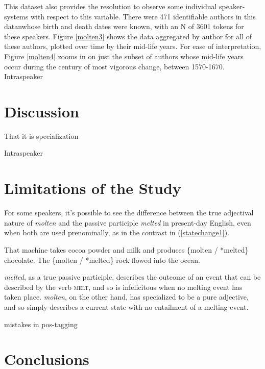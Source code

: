 \documentclass{artikel3}
\begin{document}
This dataset also provides the resolution to observe some individual speaker-systems with respect to this variable. There were 471 identifiable authors in this datanwhose birth and death dates were known, with an N of 3601 tokens for these speakers. Figure \ref{molten3} shows the data aggregated by author for all of these authors, plotted over time by their mid-life years. For ease of interpretation, Figure \ref{molten4} zooms in on just the subset of authors whose mid-life years occur during the century of most vigorous change, between 1570-1670. Intraspeaker



\section{Discussion}
\label{discuss}

That it is specialization

Intraspeaker

\section{Limitations of the Study}
\label{limitations}


For some speakers, it's possible to see the difference between the true adjectival nature of \textsl{molten} and the passive participle \textsl{melted} in present-day English, even when both are used prenominally, as in the contrast in (\ref{statechange1}). 

\begin{exe}
	\ex \label{statechange1} That machine takes cocoa powder and milk and produces \{molten / *melted\} chocolate.
	\ex \label{statechange2} The \{molten / *melted\} rock flowed into the ocean.
\end{exe}

\noindent \textsl{melted}, as a true passive participle, describes the outcome of an event that can be described by the verb \textsc{melt}, and so is infelicitous when no melting event has taken place. \textsl{molten}, on the other hand, has specialized to be a pure adjective, and so simply describes a current state with no entailment of a melting event.


mistakes in pos-tagging

\section{Conclusions}
\end{document}
